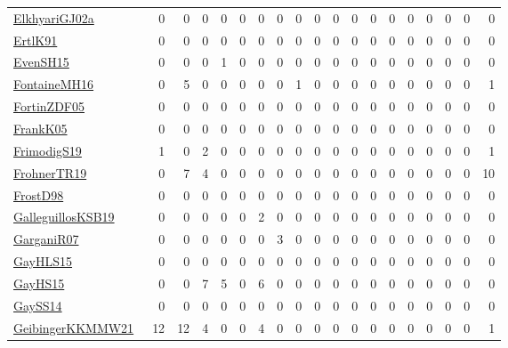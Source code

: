 {\begin{longtable}{l*{18}{r}}
\href{papers/ElkhyariGJ02a.pdf}{ElkhyariGJ02a}~\cite{ElkhyariGJ02a} & 0 & 0 & 0 & 0 & 0 & 0 & 0 & 0 & 0 & 0 & 0 & 0 & 0 & 0 & 0 & 0 & 0 & 0\\
\href{papers/ErtlK91.pdf}{ErtlK91}~\cite{ErtlK91} & 0 & 0 & 0 & 0 & 0 & 0 & 0 & 0 & 0 & 0 & 0 & 0 & 0 & 0 & 0 & 0 & 0 & 0\\
\href{papers/EvenSH15.pdf}{EvenSH15}~\cite{EvenSH15} & 0 & 0 & 0 & 1 & 0 & 0 & 0 & 0 & 0 & 0 & 0 & 0 & 0 & 0 & 0 & 0 & 0 & 0\\
\href{papers/FontaineMH16.pdf}{FontaineMH16}~\cite{FontaineMH16} & 0 & 5 & 0 & 0 & 0 & 0 & 0 & 1 & 0 & 0 & 0 & 0 & 0 & 0 & 0 & 0 & 0 & 1\\
\href{papers/FortinZDF05.pdf}{FortinZDF05}~\cite{FortinZDF05} & 0 & 0 & 0 & 0 & 0 & 0 & 0 & 0 & 0 & 0 & 0 & 0 & 0 & 0 & 0 & 0 & 0 & 0\\
\href{papers/FrankK05.pdf}{FrankK05}~\cite{FrankK05} & 0 & 0 & 0 & 0 & 0 & 0 & 0 & 0 & 0 & 0 & 0 & 0 & 0 & 0 & 0 & 0 & 0 & 0\\
\href{papers/FrimodigS19.pdf}{FrimodigS19}~\cite{FrimodigS19} & 1 & 0 & 2 & 0 & 0 & 0 & 0 & 0 & 0 & 0 & 0 & 0 & 0 & 0 & 0 & 0 & 0 & 1\\
\href{papers/FrohnerTR19.pdf}{FrohnerTR19}~\cite{FrohnerTR19} & 0 & 7 & 4 & 0 & 0 & 0 & 0 & 0 & 0 & 0 & 0 & 0 & 0 & 0 & 0 & 0 & 0 & 10\\
\href{papers/FrostD98.pdf}{FrostD98}~\cite{FrostD98} & 0 & 0 & 0 & 0 & 0 & 0 & 0 & 0 & 0 & 0 & 0 & 0 & 0 & 0 & 0 & 0 & 0 & 0\\
\href{papers/GalleguillosKSB19.pdf}{GalleguillosKSB19}~\cite{GalleguillosKSB19} & 0 & 0 & 0 & 0 & 0 & 2 & 0 & 0 & 0 & 0 & 0 & 0 & 0 & 0 & 0 & 0 & 0 & 0\\
\href{papers/GarganiR07.pdf}{GarganiR07}~\cite{GarganiR07} & 0 & 0 & 0 & 0 & 0 & 0 & 3 & 0 & 0 & 0 & 0 & 0 & 0 & 0 & 0 & 0 & 0 & 0\\
\href{papers/GayHLS15.pdf}{GayHLS15}~\cite{GayHLS15} & 0 & 0 & 0 & 0 & 0 & 0 & 0 & 0 & 0 & 0 & 0 & 0 & 0 & 0 & 0 & 0 & 0 & 0\\
\href{papers/GayHS15.pdf}{GayHS15}~\cite{GayHS15} & 0 & 0 & 7 & 5 & 0 & 6 & 0 & 0 & 0 & 0 & 0 & 0 & 0 & 0 & 0 & 0 & 0 & 0\\
\href{papers/GaySS14.pdf}{GaySS14}~\cite{GaySS14} & 0 & 0 & 0 & 0 & 0 & 0 & 0 & 0 & 0 & 0 & 0 & 0 & 0 & 0 & 0 & 0 & 0 & 0\\
\href{papers/GeibingerKKMMW21.pdf}{GeibingerKKMMW21}~\cite{GeibingerKKMMW21} & 12 & 12 & 4 & 0 & 0 & 4 & 0 & 0 & 0 & 0 & 0 & 0 & 0 & 0 & 0 & 0 & 0 & 1\\

\end{longtable}}
